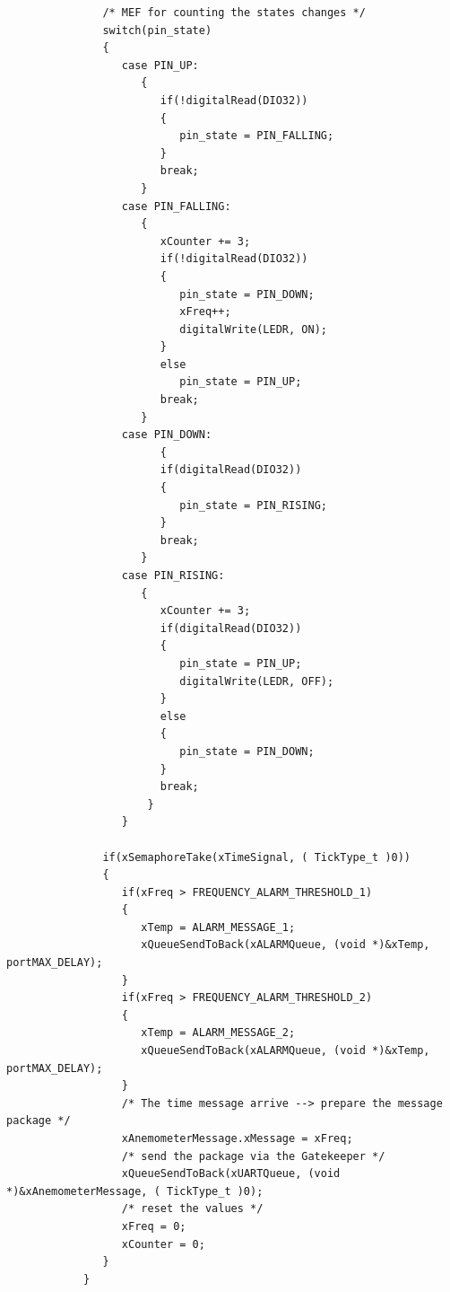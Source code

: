 \documentclass[10pt]{article}
\begin{document}
\begin{itemize}
\begin{verbatim}
               /* MEF for counting the states changes */
               switch(pin_state)
               {
                  case PIN_UP:
                     {
                        if(!digitalRead(DIO32))
                        {
                           pin_state = PIN_FALLING;
                        }
                        break;
                     }
                  case PIN_FALLING:
                     {
                        xCounter += 3;
                        if(!digitalRead(DIO32))
                        {
                           pin_state = PIN_DOWN;
                           xFreq++;
                           digitalWrite(LEDR, ON);
                        }
                        else
                           pin_state = PIN_UP;
                        break;
                     }
                  case PIN_DOWN:
                        {
                        if(digitalRead(DIO32))
                        {
                           pin_state = PIN_RISING;
                        }
                        break;
                     }
                  case PIN_RISING:
                     {
                        xCounter += 3;
                        if(digitalRead(DIO32))
                        {
                           pin_state = PIN_UP;
                           digitalWrite(LEDR, OFF);
                        }
                        else
                        {
                           pin_state = PIN_DOWN;
                        }
                        break;
                      }
                  }

               if(xSemaphoreTake(xTimeSignal, ( TickType_t )0))
               {
                  if(xFreq > FREQUENCY_ALARM_THRESHOLD_1)
                  {
                     xTemp = ALARM_MESSAGE_1;
                     xQueueSendToBack(xALARMQueue, (void *)&xTemp, portMAX_DELAY);
                  }
                  if(xFreq > FREQUENCY_ALARM_THRESHOLD_2)
                  {
                     xTemp = ALARM_MESSAGE_2;
                     xQueueSendToBack(xALARMQueue, (void *)&xTemp, portMAX_DELAY);
                  }
                  /* The time message arrive --> prepare the message package */
                  xAnemometerMessage.xMessage = xFreq;
                  /* send the package via the Gatekeeper */
                  xQueueSendToBack(xUARTQueue, (void *)&xAnemometerMessage, ( TickType_t )0);
                  /* reset the values */
                  xFreq = 0;
                  xCounter = 0;
               }
            }


\end{verbatim}
\end{itemize}
\end{document}
